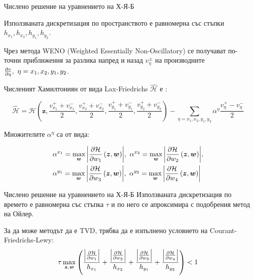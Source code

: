 \begin{frame}[t]{Числено решение на уравнението на Х-Я-Б}

Използваната дискретизация по пространството е равномерна със стъпки $h_{x_1}, h_{x_2}, h_{y_1}, h_{y_2}$.

Чрез метода WENO (Weighted Essentially Non-Oscillatory) се получават по-точни приближения за разлика напред и назад $v_{\eta}^{\pm}$ на производните $\pdv{v}{\eta},~ \eta = x_1, x_2, y_1, y_2$.

  Численият Хамилтониян от вида Lax-Friedrichs $\hat{\mathcal{H}}$ е :
  \begin{small}
    \begin{equation*}
      \hat{\mathcal{H}} = \mathcal{H}\left(\boldsymbol{z}, \frac{v_{x_1}^++v_{x_1}^-}{2}, \frac{v_{x_2}^++v_{x_2}^-}{2}, \frac{v_{y_1}^++v_{y_1}^-}{2}, \frac{v_{y_2}^++v_{y_2}^-}{2}\right) - \sum_{\eta = x_1, x_2, y_1, y_2} \alpha^{\eta} \frac{v_{\eta}^+-v_{\eta}^-}{2}
    \end{equation*}
  \end{small}
  Множителите $\alpha^{\eta}$ са от вида:
  \begin{small}
    \begin{equation*}
      \begin{split}
        &\alpha^{x_1} = \max_{\boldsymbol{w}} \abs{\pdv{\mathcal{H}}{w_1}\left(\boldsymbol{z}, \boldsymbol{w}\right)},~
        \alpha^{x_2} = \max_{\boldsymbol{w}} \abs{\pdv{\mathcal{H}}{w_2}\left(\boldsymbol{z}, \boldsymbol{w}\right)}, \\
        &\alpha^{y_1} = \max_{\boldsymbol{w}} \abs{\pdv{\mathcal{H}}{w_3}\left(\boldsymbol{z}, \boldsymbol{w}\right)},~
        \alpha^{y_2} = \max_{\boldsymbol{w}} \abs{\pdv{\mathcal{H}}{w_4}\left(\boldsymbol{z}, \boldsymbol{w}\right)}
      \end{split}
    \end{equation*}
  \end{small}
\end{frame}

\begin{frame}[c]{Числено решение на уравнението на Х-Я-Б}
  Използваната дискретизация по времето е равномерна със стъпка $\tau$ и по него се апроксимира с подобрения метод на Ойлер.

  За да може методът да е TVD, трябва да е изпълнено условието на Courant-Friedrichs-Lewy:
  \begin{equation*}
    \tau \max_{\boldsymbol{z}, \boldsymbol{w}} \left(\frac{\abs{\pdv{\mathcal{H}}{w_1}}}{h_{x_1}} + \frac{\abs{\pdv{\mathcal{H}}{w_2}}}{h_{x_2}} + \frac{\abs{\pdv{\mathcal{H}}{w_3}}}{h_{y_1}} + \frac{\abs{\pdv{\mathcal{H}}{w_4}}}{h_{y_2}}\right) < 1
  \end{equation*}
\end{frame}
